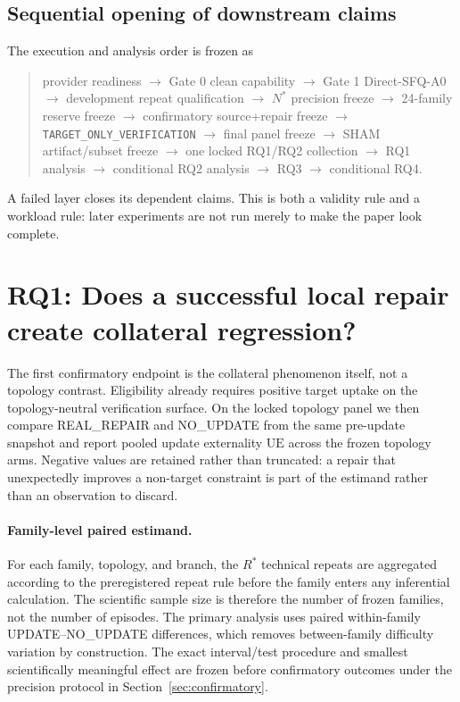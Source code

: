 \documentclass{article}
\begin{document}
\subsection{Sequential opening of downstream claims}
The execution and analysis order is frozen as
\begin{quote}\small
provider readiness $\rightarrow$ Gate 0 clean capability $\rightarrow$ Gate 1 Direct-SFQ-A0 $\rightarrow$ development repeat qualification $\rightarrow$ $N^*$ precision freeze $\rightarrow$ 24-family reserve freeze $\rightarrow$ confirmatory source+repair freeze $\rightarrow$ \texttt{TARGET\_ONLY\_VERIFICATION} $\rightarrow$ final panel freeze $\rightarrow$ SHAM artifact/subset freeze $\rightarrow$ one locked RQ1/RQ2 collection $\rightarrow$ RQ1 analysis $\rightarrow$ conditional RQ2 analysis $\rightarrow$ RQ3 $\rightarrow$ conditional RQ4.
\end{quote}
A failed layer closes its dependent claims. This is both a validity rule and a workload rule: later experiments are not run merely to make the paper look complete.

\section{RQ1: Does a successful local repair create collateral regression?}
\label{sec:rq1}
The first confirmatory endpoint is the collateral phenomenon itself, not a topology contrast. Eligibility already requires positive target uptake on the topology-neutral verification surface. On the locked topology panel we then compare REAL\_REPAIR and NO\_UPDATE from the same pre-update snapshot and report pooled update externality $\mathrm{UE}$ across the frozen topology arms. Negative values are retained rather than truncated: a repair that unexpectedly improves a non-target constraint is part of the estimand rather than an observation to discard.

\paragraph{Family-level paired estimand.}
For each family, topology, and branch, the $R^*$ technical repeats are aggregated according to the preregistered repeat rule before the family enters any inferential calculation. The scientific sample size is therefore the number of frozen families, not the number of episodes. The primary analysis uses paired within-family UPDATE--NO\_UPDATE differences, which removes between-family difficulty variation by construction. The exact interval/test procedure and smallest scientifically meaningful effect are frozen before confirmatory outcomes under the precision protocol in Section~\ref{sec:confirmatory}.
\end{document}
